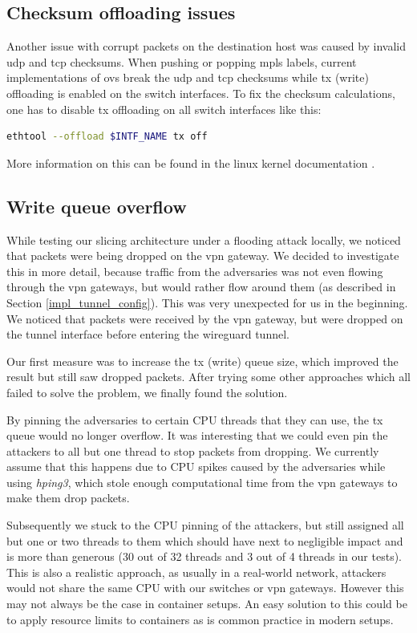 \subsection{Checksum offloading issues}
Another issue with corrupt packets on the destination host was caused by invalid \acrshort{udp} and \acrshort{tcp} checksums. When pushing or popping \acrshort{mpls} labels, current implementations of \Gls{ovs} break the \acrshort{udp} and \acrshort{tcp} checksums while \acrshort{tx} (write) offloading is enabled on the switch interfaces. To fix the checksum calculations, one has to disable \acrshort{tx} offloading on all switch interfaces like this:

\begin{lstlisting}[language=bash]
ethtool --offload $INTF_NAME tx off
\end{lstlisting}

More information on this can be found in the linux kernel documentation \cite{txoffload}.

\subsection{Write queue overflow}
While testing our slicing architecture under a flooding attack locally, we noticed that packets were being dropped on the \acrshort{vpn} gateway. We decided to investigate this in more detail, because traffic from the adversaries was not even flowing through the \acrshort{vpn} gateways, but would rather flow around them (as described in Section \ref{impl_tunnel_config}). This was very unexpected for us in the beginning. We noticed that packets were received by the \acrshort{vpn} gateway, but were dropped on the tunnel interface before entering the \gls{wireguard} tunnel.

Our first measure was to increase the \acrshort{tx} (write) queue size, which improved the result but still saw dropped packets. After trying some other approaches which all failed to solve the problem, we finally found the solution.

By pinning the adversaries to certain CPU threads that they can use, the \acrshort{tx} queue would no longer overflow. It was interesting that we could even pin the attackers to all but one thread to stop packets from dropping. We currently assume that this happens due to CPU spikes caused by the adversaries while using \textit{hping3}, which stole enough computational time from the \acrshort{vpn} gateways to make them drop packets.

Subsequently we stuck to the CPU pinning of the attackers, but still assigned all but one or two threads to them which should have next to negligible impact and is more than generous (30 out of 32 threads and 3 out of 4 threads in our tests). This is also a realistic approach, as usually in a real-world network, attackers would not share the same CPU with our switches or \acrshort{vpn} gateways. However this may not always be the case in container setups. An easy solution to this could be to apply resource limits to containers as is common practice in modern setups.

